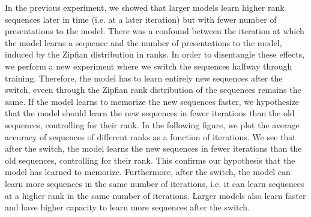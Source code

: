 \documentclass{article}
\theoremstyle{plain}
\theoremstyle{definition}
\theoremstyle{remark}
\begin{document}
In the previous experiment, we showed that larger models learn 
higher rank sequences later in time (i.e. at a later iteration) but 
with fewer number of presentations to the model.
There was a confound between the iteration at which the model learns a sequence and the number of presentations to the model, 
induced by the Zipfian distribution in ranks.
In order to disentangle these effects, we 
perform a new experiment where we switch the sequences halfway through training. 
Therefore, the model has to learn entirely new sequences after the switch, 
eveen through the Zipfian rank distribution of the sequences remains the same.
If the model learns to memorize the new sequences faster, we 
hypothesize that the model should learn the new sequences in fewer iterations than the old sequences, controlling 
for their rank.
In the following figure, we plot the average accuracy of sequences of different ranks as a function of iterations.
We see that after the switch, the model learns the new sequences in fewer iterations than the old sequences, controlling 
for their rank. This confirms our hypothesis that the model has learned to memorize.
Furthermore, after the switch, the model can learn more sequences in the same number of iterations, i.e. 
it can learn sequences at a higher rank in the same number of iterations.
Larger models also learn faster and have higher capacity to learn more sequences after the switch.
\end{document}

